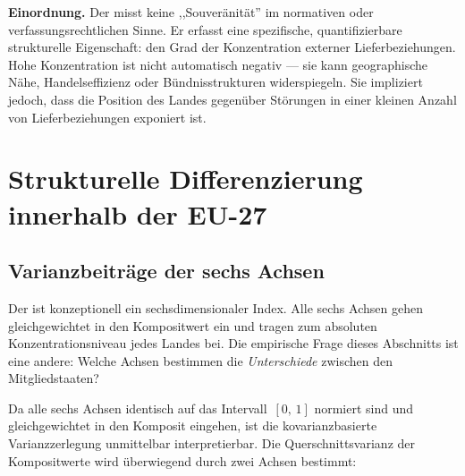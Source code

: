 \begin{sloppypar}
\textbf{Einordnung.}
Der \ISI misst keine ,,Souver\"anit\"at'' im normativen oder
verfassungs\-rechtlichen Sinne.  Er erfasst eine spezifische,
quantifizier\-bare strukturelle Eigenschaft: den Grad der
Konzentration externer Liefer\-beziehungen.  Hohe Konzentration
ist nicht automatisch negativ --- sie kann geographische N\"ahe,
Handels\-effizienz oder B\"undnis\-strukturen widerspiegeln.  Sie
impliziert jedoch, dass die Position des Landes gegen\"uber
St\"orungen in einer kleinen Anzahl von Liefer\-beziehungen
exponiert ist.
\end{sloppypar}


\newpage
\section{Strukturelle Differenzierung innerhalb der EU-27}
\label{sec:differenzierung}

\subsection{Varianzbeitr\"age der sechs Achsen}

\begin{sloppypar}
Der \ISI ist konzeptionell ein sechs\-dimensionaler Index.  Alle
sechs Achsen gehen gleichgewichtet in den Kompositwert ein und tragen
zum absoluten Konzentrations\-niveau jedes Landes bei.  Die
empirische Frage dieses Abschnitts ist eine andere: Welche Achsen
bestimmen die \emph{Unterschiede} zwischen den Mitgliedstaaten?
\end{sloppypar}

\begin{sloppypar}
Da alle sechs Achsen identisch auf das Intervall~$[0,\,1]$ normiert
sind und gleichgewichtet in den Komposit eingehen, ist die
kovarianz\-basierte Varianz\-zerlegung unmittelbar interpretierbar.
Die Querschnitts\-varianz der Kompositwerte wird \"uberwiegend durch
zwei Achsen bestimmt:
\end{sloppypar}

